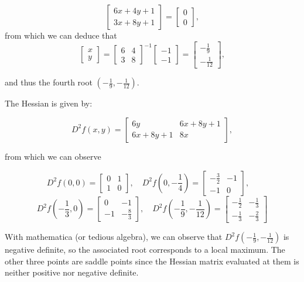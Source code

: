 \documentclass[letterpaper,12pt]{article}
\theoremstyle{definition}
\begin{document}
$$\begin{bmatrix}
6x + 4y + 1 \\ 
3x + 8y + 1
\end{bmatrix} =
\begin{bmatrix}
0 \\ 
0
\end{bmatrix},$$ from which we can deduce that $$\begin{bmatrix}
x \\ 
y
\end{bmatrix} 
= \begin{bmatrix}
6 & 4 \\ 
3 & 8
\end{bmatrix}^{-1} \begin{bmatrix}
-1 \\ 
-1
\end{bmatrix} = 
\begin{bmatrix}
-\frac{1}{9} \\ 
-\frac{1}{12}
\end{bmatrix}, $$

and thus the fourth root $(-\frac{1}{9}, -\frac{1}{12})$.

The Hessian is given by:

$$ D^2f(x,y) = 
\begin{bmatrix}
6y & 6x + 8y + 1 \\
6x + 8y + 1 & 8x
\end{bmatrix},$$

from which we can observe

$$ D^2f(0,0) = 
\begin{bmatrix}
0 & 1 \\
1 & 0
\end{bmatrix}, \quad 
D^2f(0,-\frac{1}{4}) = 
\begin{bmatrix}
-\frac{3}{2} & -1 \\
-1 & 0
\end{bmatrix}, \quad$$
$$
D^2f(-\frac{1}{3},0) = 
\begin{bmatrix}
0 & -1 \\
-1 & -\frac{8}{3}
\end{bmatrix}, \quad
D^2f(-\frac{1}{9},-\frac{1}{12}) = 
\begin{bmatrix}
-\frac{1}{2} & -\frac{1}{3} \\
-\frac{1}{3} & -\frac{2}{3}
\end{bmatrix}$$

With mathematica (or tedious algebra), we can observe that $D^2f(-\frac{1}{9},-\frac{1}{12})$ is negative definite, so the associated root corresponds to a local maximum. The other three points are saddle points since the Hessian matrix evaluated at them is neither positive nor negative definite.
\end{document}
